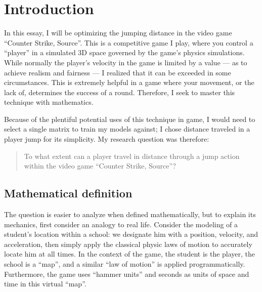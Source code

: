 \section{Introduction}


In this essay, I will be optimizing the jumping distance in the video game ``Counter Strike, Source''. This is a competitive game I play, where you control a ``player'' in a simulated 3D space governed by the game's physics simulations. While normally the player's velocity in the game is limited by a value --- as to achieve realism and fairness --- I realized that it can be exceeded in some circumstances. This is extremely helpful in a game where your movement, or the lack of, determines the success of a round. Therefore, I seek to master this technique with mathematics.


Because of the plentiful potential uses of this technique in game, I would need to select a single matrix to train my models against; I chose distance traveled in a player jump for its simplicity. My research question was therefore:
\begin{quote}
    To what extent can a player travel in distance through a jump action within the video game ``Counter Strike, Source''?
\end{quote}

\subsection{Mathematical definition}
The question is easier to analyze when defined mathematically, but to explain its mechanics, first consider an analogy to real life. Consider the modeling of a student's location within a school: we designate him with a position, velocity, and acceleration, then simply apply the classical physic laws of motion to accurately locate him at all times. In the context of the game, the student is the player, the school is a ``map'', and a similar ``law of motion'' is applied programmatically. Furthermore, the game uses ``hammer units'' and seconds as units of space and time in this virtual ``map''.


